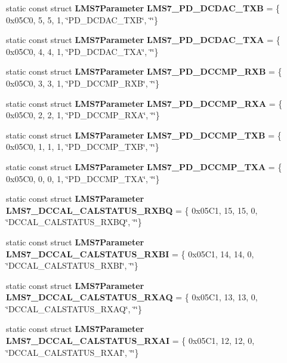 \begin{DoxyCompactItemize}
\item 
static const struct {\bf L\+M\+S7\+Parameter} {\bf L\+M\+S7\+\_\+\+P\+D\+\_\+\+D\+C\+D\+A\+C\+\_\+\+T\+XB} = \{ 0x05\+C0, 5, 5, 1, \char`\"{}\+P\+D\+\_\+\+D\+C\+D\+A\+C\+\_\+\+T\+X\+B\char`\"{}, \char`\"{}\char`\"{}\}
\item 
static const struct {\bf L\+M\+S7\+Parameter} {\bf L\+M\+S7\+\_\+\+P\+D\+\_\+\+D\+C\+D\+A\+C\+\_\+\+T\+XA} = \{ 0x05\+C0, 4, 4, 1, \char`\"{}\+P\+D\+\_\+\+D\+C\+D\+A\+C\+\_\+\+T\+X\+A\char`\"{}, \char`\"{}\char`\"{}\}
\item 
static const struct {\bf L\+M\+S7\+Parameter} {\bf L\+M\+S7\+\_\+\+P\+D\+\_\+\+D\+C\+C\+M\+P\+\_\+\+R\+XB} = \{ 0x05\+C0, 3, 3, 1, \char`\"{}\+P\+D\+\_\+\+D\+C\+C\+M\+P\+\_\+\+R\+X\+B\char`\"{}, \char`\"{}\char`\"{}\}
\item 
static const struct {\bf L\+M\+S7\+Parameter} {\bf L\+M\+S7\+\_\+\+P\+D\+\_\+\+D\+C\+C\+M\+P\+\_\+\+R\+XA} = \{ 0x05\+C0, 2, 2, 1, \char`\"{}\+P\+D\+\_\+\+D\+C\+C\+M\+P\+\_\+\+R\+X\+A\char`\"{}, \char`\"{}\char`\"{}\}
\item 
static const struct {\bf L\+M\+S7\+Parameter} {\bf L\+M\+S7\+\_\+\+P\+D\+\_\+\+D\+C\+C\+M\+P\+\_\+\+T\+XB} = \{ 0x05\+C0, 1, 1, 1, \char`\"{}\+P\+D\+\_\+\+D\+C\+C\+M\+P\+\_\+\+T\+X\+B\char`\"{}, \char`\"{}\char`\"{}\}
\item 
static const struct {\bf L\+M\+S7\+Parameter} {\bf L\+M\+S7\+\_\+\+P\+D\+\_\+\+D\+C\+C\+M\+P\+\_\+\+T\+XA} = \{ 0x05\+C0, 0, 0, 1, \char`\"{}\+P\+D\+\_\+\+D\+C\+C\+M\+P\+\_\+\+T\+X\+A\char`\"{}, \char`\"{}\char`\"{}\}
\item 
static const struct {\bf L\+M\+S7\+Parameter} {\bf L\+M\+S7\+\_\+\+D\+C\+C\+A\+L\+\_\+\+C\+A\+L\+S\+T\+A\+T\+U\+S\+\_\+\+R\+X\+BQ} = \{ 0x05\+C1, 15, 15, 0, \char`\"{}\+D\+C\+C\+A\+L\+\_\+\+C\+A\+L\+S\+T\+A\+T\+U\+S\+\_\+\+R\+X\+B\+Q\char`\"{}, \char`\"{}\char`\"{}\}
\item 
static const struct {\bf L\+M\+S7\+Parameter} {\bf L\+M\+S7\+\_\+\+D\+C\+C\+A\+L\+\_\+\+C\+A\+L\+S\+T\+A\+T\+U\+S\+\_\+\+R\+X\+BI} = \{ 0x05\+C1, 14, 14, 0, \char`\"{}\+D\+C\+C\+A\+L\+\_\+\+C\+A\+L\+S\+T\+A\+T\+U\+S\+\_\+\+R\+X\+B\+I\char`\"{}, \char`\"{}\char`\"{}\}
\item 
static const struct {\bf L\+M\+S7\+Parameter} {\bf L\+M\+S7\+\_\+\+D\+C\+C\+A\+L\+\_\+\+C\+A\+L\+S\+T\+A\+T\+U\+S\+\_\+\+R\+X\+AQ} = \{ 0x05\+C1, 13, 13, 0, \char`\"{}\+D\+C\+C\+A\+L\+\_\+\+C\+A\+L\+S\+T\+A\+T\+U\+S\+\_\+\+R\+X\+A\+Q\char`\"{}, \char`\"{}\char`\"{}\}
\item 
static const struct {\bf L\+M\+S7\+Parameter} {\bf L\+M\+S7\+\_\+\+D\+C\+C\+A\+L\+\_\+\+C\+A\+L\+S\+T\+A\+T\+U\+S\+\_\+\+R\+X\+AI} = \{ 0x05\+C1, 12, 12, 0, \char`\"{}\+D\+C\+C\+A\+L\+\_\+\+C\+A\+L\+S\+T\+A\+T\+U\+S\+\_\+\+R\+X\+A\+I\char`\"{}, \char`\"{}\char`\"{}\}

\end{DoxyCompactItemize}
